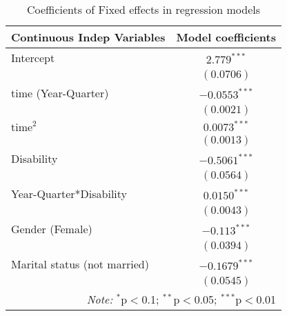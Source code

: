 \noindent
\begin{table}[H] 
\centering 
\footnotesize
\caption{Coefficients of Fixed effects in regression models} 
\begin{tabular}{l|c}
\hline 
\hline 
%
Continuous Indep Variables & Model coefficients \\
\hline 
Intercept			&	$2.779^{***}$		\\
				&	$(0.0706)$		\\
time (Year-Quarter)		&	$-0.0553^{***}$		\\
				&	$(0.0021)$		\\
$\text{time}^2$			&	$0.0073^{***}$		\\
				&	$(0.0013)$		\\
Disability			&	$-0.5061^{***}$		\\    
				&	$(0.0564)$		\\
Year-Quarter*Disability		&	$0.0150^{***}$		\\
				&	$(0.0043)$		\\
Gender (Female)	 		&	$-0.113^{***}$		\\
				&	$(0.0394)$		\\
Marital status (not married) 	&	$-0.1679^{***}$		\\
				&	$(0.0545)$		\\
\hline 
\hline 
\multicolumn{2}{r}{\textit{Note:}  $^{*}$p$<$0.1; $^{**}$p$<$0.05; $^{***}$p$<$0.01} \\ 

\end{tabular}
\label{tab:FixedEffectsBetas} 
\end{table}


